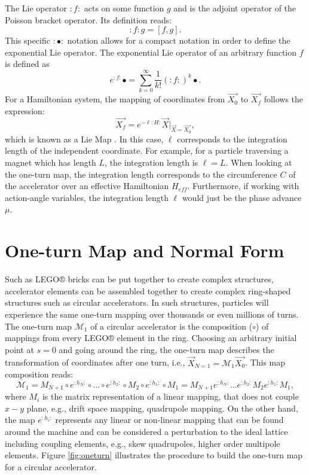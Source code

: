 The Lie operator $:f:$ acts on some function $g$ and is the adjoint operator of the Poisson bracket operator. Its definition reads:
\begin{equation}
    \label{eq:ch2lie1}
    :f:g = \left[ f,g \right].
\end{equation}
This specific $:\bullet:$ notation allows for a compact notation in order to define the exponential Lie operator. The exponential Lie operator of an arbitrary function $f$ is defined as
\begin{equation}
    \label{eq:ch2explie1}
    e^{:f:}\bullet = \sum_{k=0}^{\infty}\frac{1}{k!}\left( :f: \right)^k \bullet.
\end{equation}
For a Hamiltonian system, the mapping of coordinates from $\vec{X_0}$ to $\vec{X_f}$ follows the expression:
\begin{equation}
    \label{eq:ch2liemap1}
    \vec{X_f}=e^{-\ell :H:}\vec{X}\bigg\rvert_{\vec{X}=\vec{X_0}},
\end{equation}
which is known as a Lie Map \cite{todd1}. In this case, $\ell$ corresponds to the integration length of the independent coordinate. For example, for a particle traversing a magnet which has length $L$, the integration length is $\ell = L$. When looking at the one-turn map, the integration length corresponds to the circumference $C$ of the accelerator over an effective Hamiltonian $H_{eff}$. Furthermore, if working with action-angle variables, the integration length $\ell$ would just be the phase advance $\mu$.\\ 

\section{\label{sec:oneturn}One-turn Map and Normal Form}

Such as LEGO® bricks can be put together to create complex structures, accelerator elements can be assembled together to create complex ring-shaped structures such as circular accelerators. In such structures, particles will experience the same one-turn mapping over thousands or even millions of turns. The one-turn map $\mathcal{M}_1$ of a circular accelerator is the composition ($\circ$) of mappings from every LEGO® element in the ring. Choosing an arbitrary initial point at $s=0$ and going around the ring, the one-turn map describes the transformation of coordinates after one turn, i.e., $\vec{X}_{N=1}=\mathcal{M}_1 \vec{X_0}$. This map composition reads:
\begin{equation}
    \label{eq:oneturnmap}
    \mathcal{M}_1=M_{N+1} \circ e^{:h_N:} \circ \dots \circ e^{:h_2:} \circ M_2 \circ e^{:h_1:} \circ M_1 = M_{N+1}e^{:h_N:} \dots e^{:h_2:}M_2 e^{:h_1:}M_1,
\end{equation}
where $M_i$ is the matrix representation of a linear mapping, that does not couple $x-y$ plane, e.g., drift space mapping, quadrupole mapping. On the other hand, the map $e^{:h_i:}$ represents any linear or non-linear mapping that can be found around the machine and can be considered a perturbation to the ideal lattice including coupling elements, e.g., skew quadrupoles, higher order multipole elements. Figure \ref{fig:oneturn} illustrates the procedure to build the one-turn map for a circular accelerator. 


